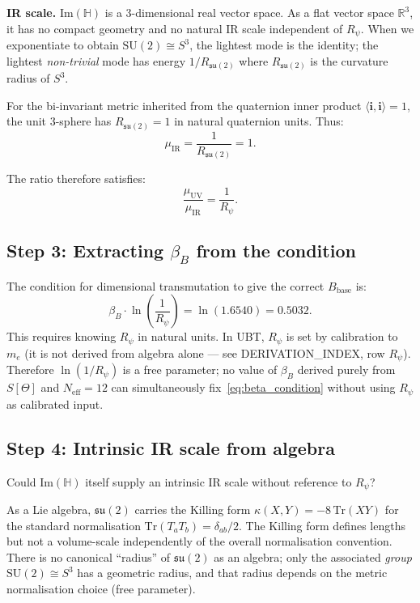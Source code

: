 \documentclass[11pt,a4paper]{article}
\theoremstyle{definition}
\theoremstyle{remark}
\begin{document}
\textbf{IR scale.}
$\mathrm{Im}(\mathbb{H})$ is a 3-dimensional real vector space.
As a flat vector space $\mathbb{R}^3$, it has no compact geometry and no
natural IR scale independent of $R_\psi$.
When we exponentiate to obtain $\mathrm{SU}(2) \cong S^3$, the lightest mode
is the identity; the lightest \emph{non-trivial} mode has energy $1/R_{\mathfrak{su}(2)}$
where $R_{\mathfrak{su}(2)}$ is the curvature radius of $S^3$.

For the bi-invariant metric inherited from the quaternion inner product
$\langle \mathbf{i}, \mathbf{i}\rangle = 1$, the unit 3-sphere has
$R_{\mathfrak{su}(2)} = 1$ in natural quaternion units.
Thus:
\begin{equation}
  \mu_{\mathrm{IR}} = \frac{1}{R_{\mathfrak{su}(2)}} = 1.
  \label{eq:mu_IR}
\end{equation}

The ratio therefore satisfies:
\begin{equation}
  \frac{\mu_{\mathrm{UV}}}{\mu_{\mathrm{IR}}} = \frac{1}{R_\psi}.
  \label{eq:ratio_scales}
\end{equation}

\subsection{Step 3: Extracting $\beta_B$ from the condition}

The condition for dimensional transmutation to give the correct $B_{\mathrm{base}}$ is:
\begin{equation}
  \beta_B \cdot \ln\!\left(\frac{1}{R_\psi}\right) = \ln(1.6540) = 0.5032.
  \label{eq:beta_condition}
\end{equation}
This requires knowing $R_\psi$ in natural units.
In UBT, $R_\psi$ is set by calibration to $m_e$ (it is not derived from algebra
alone — see DERIVATION\_INDEX, row $R_\psi$).
Therefore $\ln(1/R_\psi)$ is a free parameter; no value of $\beta_B$ derived purely
from $S[\Theta]$ and $N_{\mathrm{eff}} = 12$ can simultaneously fix~\eqref{eq:beta_condition}
without using $R_\psi$ as calibrated input.

\subsection{Step 4: Intrinsic IR scale from algebra}

Could $\mathrm{Im}(\mathbb{H})$ itself supply an intrinsic IR scale
without reference to $R_\psi$?

As a Lie algebra, $\mathfrak{su}(2)$ carries the Killing form
$\kappa(X,Y) = -8\,\mathrm{Tr}(XY)$ for the standard normalisation
$\mathrm{Tr}(T_a T_b) = \delta_{ab}/2$.
The Killing form defines lengths but not a volume-scale independently
of the overall normalisation convention.
There is no canonical ``radius'' of $\mathfrak{su}(2)$ as an algebra;
only the associated \emph{group} $\mathrm{SU}(2) \cong S^3$ has a geometric radius,
and that radius depends on the metric normalisation choice (free parameter).
\end{document}
